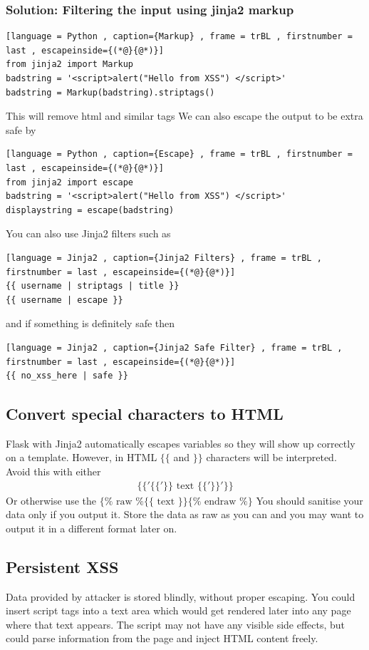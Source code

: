 \documentclass[a4paper]{article}
\theoremstyle{plain}
\theoremstyle{definition}
\theoremstyle{remark}
\begin{document}
\begin{flushleft}
\subsubsection{Solution: Filtering the input using jinja2 markup}
\begin{lstlisting}[language = Python , caption={Markup} , frame = trBL , firstnumber = last , escapeinside={(*@}{@*)}]
from jinja2 import Markup
badstring = '<script>alert("Hello from XSS") </script>'
badstring = Markup(badstring).striptags()
\end{lstlisting}
This will remove html and similar tags We can also escape the output to be extra safe by
\begin{lstlisting}[language = Python , caption={Escape} , frame = trBL , firstnumber = last , escapeinside={(*@}{@*)}]
from jinja2 import escape
badstring = '<script>alert("Hello from XSS") </script>'
displaystring = escape(badstring)
\end{lstlisting}
You can also use Jinja2 filters such as
\begin{lstlisting}[language = Jinja2 , caption={Jinja2 Filters} , frame = trBL , firstnumber = last , escapeinside={(*@}{@*)}]
{{ username | striptags | title }}
{{ username | escape }}
\end{lstlisting}
and if something is definitely safe then
\begin{lstlisting}[language = Jinja2 , caption={Jinja2 Safe Filter} , frame = trBL , firstnumber = last , escapeinside={(*@}{@*)}]
{{ no_xss_here | safe }}
\end{lstlisting}
\subsection{Convert special characters to HTML}
Flask with Jinja2 automatically escapes variables so they will show up correctly on a template. However, in HTML $\{\{$ and $\}\}$ characters will be interpreted. Avoid this with either
\begin{align*}
	\{\{'\{\{'\}\} \text{ text } \{ \{ ' \} \} ' \} \}
\end{align*}
Or otherwise use the $\{ \% \text{ raw }\% \{ \{  \text{ text } \} \} \{\% \text{ endraw }\% \}$ You should sanitise your data only if you output it. Store the data as raw as you can and you may want to output it in a different format later on.
	\subsection{Persistent XSS}
	Data provided by attacker is stored blindly, without proper escaping. You could insert script tags into a text area which would get rendered later into any page where that text appears. The script may not have any visible side effects, but could parse information from the page and inject HTML content freely. 

\end{flushleft}
\end{document}
